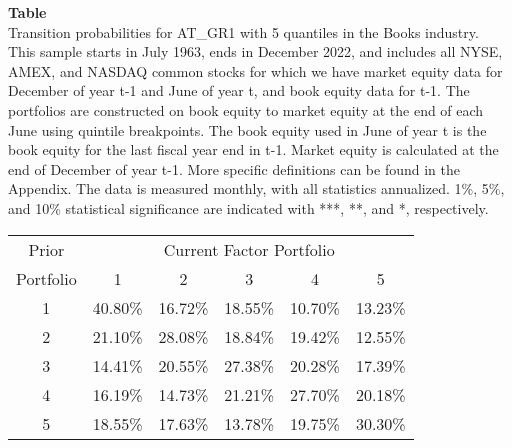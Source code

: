 \begin{table*}[ht!]
\raggedright
{}
\label{tab: transition_probs_AT_GR1_Books_with_5_quantiles}
\textbf{Table \thetable} \\
Transition probabilities for AT_GR1 with 5 quantiles in the Books industry. \\
\hspace*{1em}This sample starts in July 1963, ends in December 2022, and includes all NYSE, AMEX, and NASDAQ common stocks for which we have market equity data for December of year t-1 and June of year t, and book equity data for t-1. The portfolios are constructed on book equity to market equity at the end of each June using quintile breakpoints.  The book equity used in June of year t is the book equity for the last fiscal year end in t-1.  Market equity is calculated at the end of December of year t-1.  More specific definitions can be found in the Appendix.  The data is measured monthly, with all statistics annualized.  1\%, 5\%, and 10\% statistical significance are indicated with ***, **, and *, respectively. \\
\vspace{0.5em}
\centering
\begin{adjustbox}{max width=\textwidth}
\begin{tabular}{@{}cccccc@{}}
\toprule
Prior & \multicolumn{5}{c}{Current Factor Portfolio} \\
Portfolio & 1 & 2 & 3 & 4 & 5 \\
\midrule
1 & 40.80\% & 16.72\% & 18.55\% & 10.70\% & 13.23\% \\
2 & 21.10\% & 28.08\% & 18.84\% & 19.42\% & 12.55\% \\
3 & 14.41\% & 20.55\% & 27.38\% & 20.28\% & 17.39\% \\
4 & 16.19\% & 14.73\% & 21.21\% & 27.70\% & 20.18\% \\
5 & 18.55\% & 17.63\% & 13.78\% & 19.75\% & 30.30\% \\
\bottomrule
\end{tabular}
\end{adjustbox}
\end{table*}